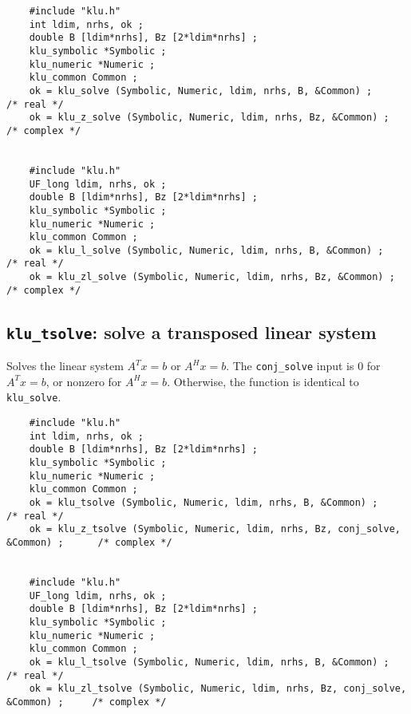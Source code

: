 \documentclass[11pt]{article}
\begin{document}
{\footnotesize
\begin{verbatim}
    #include "klu.h"
    int ldim, nrhs, ok ;
    double B [ldim*nrhs], Bz [2*ldim*nrhs] ;
    klu_symbolic *Symbolic ;
    klu_numeric *Numeric ;
    klu_common Common ;
    ok = klu_solve (Symbolic, Numeric, ldim, nrhs, B, &Common) ;                      /* real */
    ok = klu_z_solve (Symbolic, Numeric, ldim, nrhs, Bz, &Common) ;                   /* complex */


    #include "klu.h"
    UF_long ldim, nrhs, ok ;
    double B [ldim*nrhs], Bz [2*ldim*nrhs] ;
    klu_symbolic *Symbolic ;
    klu_numeric *Numeric ;
    klu_common Common ;
    ok = klu_l_solve (Symbolic, Numeric, ldim, nrhs, B, &Common) ;                    /* real */
    ok = klu_zl_solve (Symbolic, Numeric, ldim, nrhs, Bz, &Common) ;                  /* complex */
\end{verbatim}
}

\subsection{{\tt klu\_tsolve}: solve a transposed linear system}

Solves the linear system $A^Tx=b$ or $A^Hx=b$.  The {\tt conj\_solve} input
is 0 for $A^Tx=b$, or nonzero for $A^Hx=b$.  Otherwise, the function is
identical to {\tt klu\_solve}.


{\footnotesize
\begin{verbatim}
    #include "klu.h"
    int ldim, nrhs, ok ;
    double B [ldim*nrhs], Bz [2*ldim*nrhs] ;
    klu_symbolic *Symbolic ;
    klu_numeric *Numeric ;
    klu_common Common ;
    ok = klu_tsolve (Symbolic, Numeric, ldim, nrhs, B, &Common) ;                     /* real */
    ok = klu_z_tsolve (Symbolic, Numeric, ldim, nrhs, Bz, conj_solve, &Common) ;      /* complex */


    #include "klu.h"
    UF_long ldim, nrhs, ok ;
    double B [ldim*nrhs], Bz [2*ldim*nrhs] ;
    klu_symbolic *Symbolic ;
    klu_numeric *Numeric ;
    klu_common Common ;
    ok = klu_l_tsolve (Symbolic, Numeric, ldim, nrhs, B, &Common) ;                   /* real */
    ok = klu_zl_tsolve (Symbolic, Numeric, ldim, nrhs, Bz, conj_solve, &Common) ;     /* complex */
\end{verbatim}
}


\end{document}
